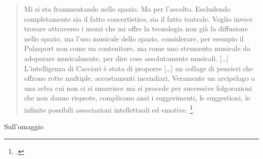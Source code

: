 \begin{quote}
Mi si sta frammentando nello spazio. Ma per l'ascolto. Escludendo completamente sia il fatto concertistico, sia il fatto teatrale. Voglio invece trovare attraverso i mezzi che mi offre la tecnologia non già la diffusione nello spazio, ma l'uso musicale dello spazio, considerare, per esempio il Palasport non come un contenitore, ma come uno strumento musicale da adoperare musicalmente, per dire cose assolutamente musicali. [\ldots] L'intelligenza di Cacciari è stata di proporre [\ldots] un collage di pensieri che offrono rotte multiple, accostamenti incendiari, Veramente un arcipelago o una selva cui non ci si smarrisce ma si procede per successive folgorazioni che non danno rispsote, complicano anzi i suggerimenti, le suggestioni, le infinite possibili associazioni intellettuali ed emotive. \footcite[vol. II p. 259-260, \emph{Intervista di Dino Villatico} 1981]{nono:scrcol}.
\end{quote}

%
%
Sull'omaggio

